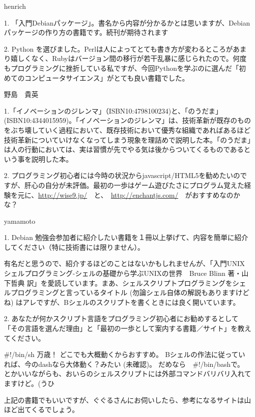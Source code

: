 \begin{prework}{ henrich }

1. 「入門Debianパッケージ」。書名から内容が分かるかとは思いますが、Debianパッケージの作り方の書籍です。続刊が期待されます

2. Python を選びました。Perlは人によってとても書き方が変わるところがあまり嬉しくなく、Rubyはバージョン間の移行が若干乱暴に感じられたので。何度もプログラミングに挫折している私ですが、今回Pythonを学ぶのに選んだ「初めてのコンピュータサイエンス」がとても良い書籍でした。
\end{prework}

\begin{prework}{ 野島　貴英 }

1.「イノベーションのジレンマ」（ISBN10:4798100234)と、「のうだま」(ISBN10:4344015959)。「イノベーションのジレンマ」は、技術革新が既存のものをぶち壊していく過程において、既存技術において優秀な組織であればあるほど技術革新についていけなくなってしまう現象を理詰めで説明した本。「のうだま」は人の行動においては、実は習慣が先でやる気は後からついてくるものであるという事を説明した本。

2. プログラミング初心者には今時の状況からjavascript/HTML5を勧めたいのですが、肝心の自分が未評価。最初の一歩はゲーム遊びたさにプログラム覚えた経験を元に、\url{http://wise9.jp/}　と、　\url{http://enchantjs.com/}　がおすすめなのかな？
\end{prework}

\begin{prework}{ yamamoto }

1. Debian 勉強会参加者に紹介したい書籍を１冊以上挙げて、内容を簡単に紹介してください（特に技術書には限りません）。

有名だと思うので、紹介するほどのことはないかもしれませんが、「入門UNIXシェルプログラミング-シェルの基礎から学ぶUNIXの世界　Bruce Blinn 著・山下哲典 訳」を愛読しています。まあ、シェルスクリプトプログラミングをシェルプログラミングと言っているタイトル (勿論シェル自体の解説もありますけどね) はアレですが、Bシェルのスクリプトを書くときには良く開いています。

2. あなたが何かスクリプト言語をプログラミング初心者にお勧めするとして「その言語を選んだ理由」と「最初の一歩として案内する書籍／サイト」を教えてください。

\#!/bin/sh 万歳！
どこでも大概動くからおすすめ。
Bシェルの作法に従っていれば、今のdashなら大体動く？みたい (未確認)。
だめなら　\#!/bin/bashで。
とかいいながらも、おいらのシェルスクリプトには外部コマンドバリバリ入れてますけど。(うひ

上記の書籍でもいいですが、ぐぐるさんにお伺いしたら、参考になるサイトは山ほど出てくるでしょう。
\end{prework}
